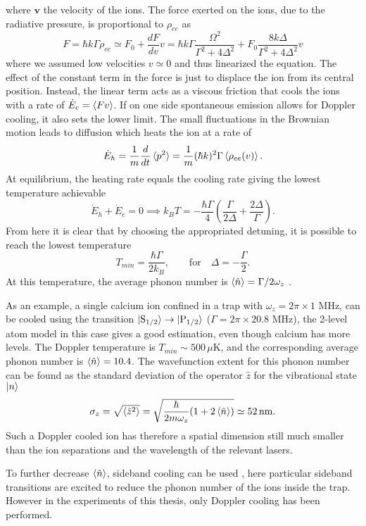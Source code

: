 where $\mathbf{v}$ the velocity of the ions. The force exerted on the ions, due to the radiative pressure, is proportional to $\rho_{ee}$ as
\begin{equation}
F = \hbar k \Gamma \rho_{ee} \simeq F_0 + \frac{dF}{dv}v = \hbar k \Gamma\frac{\Omega^2}{\Gamma^2 +4\Delta^2} + F_0 \frac{8k\Delta}{\Gamma^2 + 4\Delta^2}v
\end{equation}
where we assumed low velocities $v \simeq 0$ and thus linearized the equation. The effect of the constant term in the force is just to displace the ion from its central position. Instead, the linear term acts as a viscous friction that cools the ions with a rate of $\dot{E}_c = \braket{Fv}$.
If on one side spontaneous emission allows for Doppler cooling, it also sets the lower limit. The small fluctuations in the Brownian motion leads to diffusion which heats the ion at a rate of
\begin{equation}
\dot{E}_h = \frac{1}{m}\frac{d}{dt}\braket{p^2} =  \frac{1}{m}(\hbar k)^2 \Gamma \braket{\rho_{ee}(v)}.
\end{equation}
At equilibrium, the heating rate equals the cooling rate giving the lowest temperature achievable
\begin{equation}
\dot{E}_h + \dot{E}_c = 0  \implies k_B T = -\frac{\hbar \Gamma}{4}\left(\frac{\Gamma}{2\Delta} +\frac{2\Delta}{\Gamma}\right).
\end{equation}
From here it is clear that by choosing the appropriated detuning, it is possible to reach the lowest temperature
\begin{equation}
T_{min} = \frac{\hbar \Gamma}{2k_{B}}, \qquad \text{for} \quad \Delta = -\frac{\Gamma}{2}.
\end{equation}
At this temperature, the average phonon number is $\braket{\hat{n}} = \Gamma /2\omega_z$ \cite{Eschner:03}.\par
As an example, a single calcium ion confined in a trap with $\omega_z = 2\pi\times 1$ MHz, can be cooled using the transition $\ket{\text{S}_{1/2}}\to \ket{\text{P}_{1/2}}$ ($\Gamma = 2\pi\times 20.8$ MHz), the 2-level atom model in this case gives a good estimation, even though calcium has more levels. The Doppler temperature is $T_{min} \sim 500\,\mu$K, and the corresponding average phonon number is $\braket{\hat{n}} = 10.4$. The wavefunction extent for this phonon number can be found as the standard deviation of the operator $\hat{z}$ for the vibrational state $\ket{n}$
\begin{equation}
\sigma_z = \sqrt{\braket{\hat{z}^2}} = \sqrt{\frac{\hbar}{2m\omega_z}(1+2\braket{\hat{n}})} \simeq 52\,\text{nm}.
\end{equation}
Such a Doppler cooled ion has therefore a spatial dimension still much smaller than the ion separations and the wavelength of the relevant lasers.\par
To further decrease $\braket{\hat{n}}$, sideband cooling can be used \cite{Eschner:03}, here particular sideband transitions are excited to reduce the phonon number of the ions inside the trap. However in the experiments of this thesis, only Doppler cooling has been performed.
